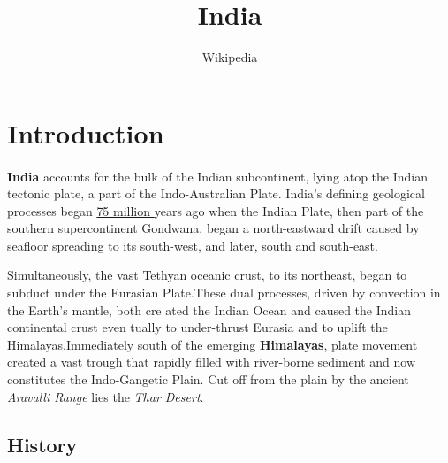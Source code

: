 \documentclass[12pt,a4paper]{article}
\title{India}
\author{Wikipedia}
\begin{document}
\maketitle
\tableofcontents
\listoffigures
\listoftables


\section{Introduction}
\paragraph{}
\textbf{India} accounts for the bulk of the Indian subcontinent, lying atop the
Indian tectonic plate, a part of the Indo-Australian Plate. India’s 
defining geological processes began \underline{75 million }years ago when the Indian Plate, 
then part of the southern supercontinent Gondwana, began a
north-eastward drift caused by seafloor spreading to its south-west, and
later, south and south-east.

\begin{flushleft}
Simultaneously, the vast Tethyan oceanic
crust, to its northeast, began to subduct under the Eurasian Plate.These
dual processes, driven by convection in the Earth’s mantle, both cre
ated the Indian Ocean and caused the Indian continental crust even
tually to under-thrust Eurasia and to uplift the Himalayas.Immediately
south of the emerging \textbf{Himalayas}, plate movement created a vast trough
that rapidly filled with river-borne sediment and now constitutes the
Indo-Gangetic Plain. Cut off from the plain by the ancient \textit{Aravalli
Range} lies the \textit{Thar Desert}.
\end{flushleft}


\subsection{History}
\end{document}
